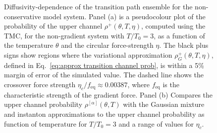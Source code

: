 \begin{figure}
    \caption[  ]
    {\small Diffusivity-dependence of the transition path ensemble for the non-conservative
model system. Panel (a) is a pseudocolour plot of the probability of the upper channel
$\rho^{+}(\theta,T,\eta)$, computed using the TMC, for the non-gradient system with $T/T_{0}=3$,
as a function of the temperature $\theta$ and the circular force-strength
$\eta$. The black plus signs show regions where the variational approximation
$\rho_{G}^{+}(\theta,T,\eta)$, defined in Eq.~\ref{eq:approx transition channel prob},
is within a 5\% margin of error of the simulated value. The dashed
line shows the crossover force strength $\eta_{c}/f_{\text{eq}}\approx0.00387$,
where $f_{\text{eq}}$ is the characteristic strength of the gradient
force. Panel (b) Compares the upper channel probability $\rho^{[\alpha]}(\theta,T)$ with the Gaussian mixture and
instanton approximations to the upper channel probability as function
of temperature for $T/T_{0}=3$ and a range of values for $\eta_c$.} \label{eq:switch noneq}
\end{figure} 

